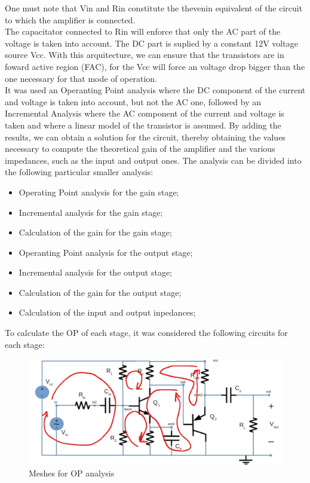 One must note that Vin and Rin constitute the thevenin equivalent of the circuit to which the amplifier is connected.\\
The capacitator connected to Rin will enforce that only the AC part of the voltage is taken into account. The DC part is suplied by a constant 12V voltage source Vcc. With this arquitecture, we can ensure that the transistors are in foward active region (FAC), for the Vcc will force an voltage drop bigger than the one necessary for that mode of operation.\\
It was used an Operanting Point analysis where the DC component of the current and voltage is taken into account, but not the AC one, followed by an Incremental Analysis where the AC component of the current and voltage is taken and where a linear model of the transistor is assumed. By adding the results, we can obtain a solution for the circuit, thereby obtaining the values necessary to compute the theoretical gain of the amplifier and the various impedances, such as the input and output ones.
The analysis can be divided into the following particular smaller analysis:
\begin{itemize}
	\item Operating Point analysis for the gain stage;
	\item Incremental analysis for the gain stage;
	\item Calculation of the gain for the gain stage;
	\item Operanting Point analysis for the output stage;
	\item Incremental analysis for the output stage;
	\item Calculation of the gain for the output stage;
	\item Calculation of the input and output inpedances;
\end{itemize}

To calculate the OP of each stage, it was considered the following circuits for each stage:

\begin{figure} [!htb] 
  \includegraphics[width=\linewidth]{malhas.jpeg}
  \caption{Meshes for OP analysis}
  \label{fig:mesh}
  \endminipage\hfill
\end{figure}


